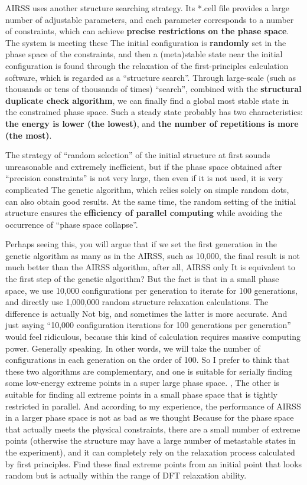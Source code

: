 \documentclass[a4paper, 10pt]{article}
\begin{document}
AIRSS uses another structure searching strategy. Its *.cell file provides a large number of adjustable parameters, and each parameter corresponds to a number of constraints, which can achieve \textbf{precise restrictions on the phase space}. The system is meeting these The initial configuration is \textbf{randomly} set in the phase space of the constraints, and then a (meta)stable state near the initial configuration is found through the relaxation of the first-principles calculation software, which is regarded as a ``structure search''. Through large-scale (such as thousands or tens of thousands of times) ``search'', combined with the \textbf{structural duplicate check algorithm}, we can finally find a global most stable state in the constrained phase space. Such a steady state probably has two characteristics: \textbf{the energy is lower (the lowest)}, and \textbf{the number of repetitions is more (the most)}.

The strategy of ``random selection'' of the initial structure at first sounds unreasonable and extremely inefficient, but if the phase space obtained after ``precision constraints'' is not very large, then even if it is not used, it is very complicated The genetic algorithm, which relies solely on simple random dots, can also obtain good results. At the same time, the random setting of the initial structure ensures the \textbf{efficiency of parallel computing} while avoiding the occurrence of ``phase space collapse''.

Perhaps seeing this, you will argue that if we set the first generation in the genetic algorithm as many as in the AIRSS, such as 10,000, the final result is not much better than the AIRSS algorithm, after all, AIRSS only It is equivalent to the first step of the genetic algorithm? But the fact is that in a small phase space, we use 10,000 configurations per generation to iterate for 100 generations, and directly use 1,000,000 random structure relaxation calculations. The difference is actually Not big, and sometimes the latter is more accurate. And just saying ``10,000 configuration iterations for 100 generations per generation'' would feel ridiculous, because this kind of calculation requires massive computing power. Generally speaking. In other words, we will take the number of configurations in each generation on the order of 100. So I prefer to think that these two algorithms are complementary, and one is suitable for serially finding some low-energy extreme points in a super large phase space. , The other is suitable for finding all extreme points in a small phase space that is tightly restricted in parallel. And according to my experience, the performance of AIRSS in a larger phase space is not as bad as we thought Because for the phase space that actually meets the physical constraints, there are a small number of extreme points (otherwise the structure may have a large number of metastable states in the experiment), and it can completely rely on the relaxation process calculated by first principles. Find these final extreme points from an initial point that looks random but is actually within the range of DFT relaxation ability.
\end{document}
